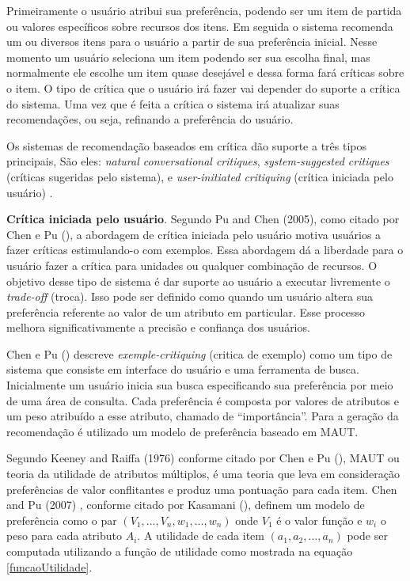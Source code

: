 Primeiramente o usuário atribui sua preferência, podendo ser um item de partida ou valores específicos sobre recursos dos itens. Em seguida o sistema recomenda um ou diversos itens para o usuário a partir de sua preferência inicial. Nesse momento um usuário seleciona um item podendo ser sua escolha final, mas normalmente ele escolhe um item quase desejável e dessa forma fará críticas sobre o item. O tipo de crítica que o usuário irá fazer vai depender do suporte a crítica do sistema. Uma vez que é feita a crítica o sistema irá atualizar suas recomendações, ou seja, refinando a preferência do usuário.

Os sistemas de recomendação baseados em crítica dão suporte a três tipos principais, São eles: \textit{natural conversational critiques}, \textit{system-suggested critiques} (críticas sugeridas pelo sistema), e \textit{user-initiated critiquing} (crítica iniciada pelo usuário) \cite{Chen:2012}.

\textbf{Crítica iniciada pelo usuário}. Segundo Pu and Chen (2005), como citado por Chen e Pu (\citeyear{Chen:2012}), a abordagem de crítica iniciada pelo usuário motiva usuários a fazer críticas estimulando-o com exemplos. Essa abordagem dá a liberdade para o usuário fazer a crítica para unidades ou qualquer combinação de recursos. O objetivo desse tipo de sistema é dar suporte ao usuário a executar livremente o \textit{trade-off} (troca). Isso pode ser definido como quando um usuário altera sua preferência referente ao valor de um atributo em particular. Esse processo melhora significativamente a precisão e confiança dos usuários.

Chen e Pu (\citeyear{Chen:2012}) descreve \textit{exemple-critiquing} (critica de exemplo) como um tipo de sistema que consiste em interface do usuário e uma ferramenta de busca. Inicialmente um usuário inicia sua busca especificando sua preferência por meio de uma área de consulta. Cada preferência é composta por valores de atributos e um peso atribuído a esse atributo, chamado de “importância”. Para a geração da recomendação é utilizado um modelo de preferência baseado em MAUT.

Segundo Keeney and Raiffa (1976) conforme citado por Chen e Pu (\citeyear{Chen:2012}), MAUT ou teoria da utilidade de atributos múltiplos, é uma teoria que leva em consideração preferências de valor conflitantes e produz uma pontuação para cada item. Chen and Pu (2007) , conforme citado por Kasamani (\citeyear{Kasamani:2017}), definem um modelo de preferência como o par \((V_1, ..., V_n, w_1, ..., w_n)\) onde \(V_1\) é o valor função e \(w_i\) o peso para cada atributo \(A_i\). A utilidade de cada item \((a_1, a_2, ..., a_n)\) pode ser computada utilizando a função de utilidade como mostrada na equação \eqref{funcaoUtilidade}.


